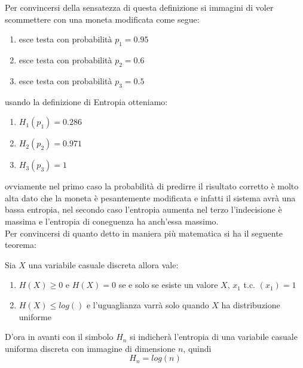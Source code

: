 Per convincersi della sensatezza di questa definizione si immagini di voler scommettere con una moneta modificata come segue:
\begin{enumerate}
\item esce testa con probabilità $p_1=0.95$
\item esce testa con probabilità $p_2=0.6$
\item esce testa con probabilità $p_3=0.5$
\end{enumerate} 
 usando la definizione di Entropia otteniamo:
 
 \begin{enumerate}
\item$H_1(p_1)=0.286$
\item$H_2(p_2)=0.971$
\item$H_3(p_3)=1$
\end{enumerate}
ovviamente nel primo caso la probabilità di predirre il risultato corretto è molto alta dato che la moneta è pesantemente modificata e infatti il sistema avrà una bassa entropia, nel secondo caso l'entropia aumenta nel terzo l'indecisione è massima e l'entropia di coneguenza ha anch'essa massimo.\\
Per convincersi di quanto detto in maniera più matematica si ha il seguente teorema:
\begin{teo}
Sia $X$ una variabile casuale discreta allora vale:
\begin{enumerate}
\item $H(X)\geq 0$ e $H(X)= 0$ se e solo se esiste un valore $X$, $x_1$ t.c. \p$(x_1)=1$
\item $H(X)\leq log()$ e l'uguaglianza varrà solo quando $X$ ha distribuzione uniforme
\end{enumerate}
\end{teo} 



D'ora in avanti con il simbolo $H_n$ si indicherà l'entropia di una variabile casuale uniforma discreta con immagine di dimensione $n$, quindi 
\begin{equation}
H_n=log(n)
\end{equation}

